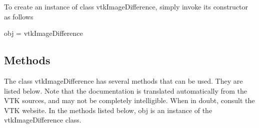 To create an instance of class vtk\-Image\-Difference, simply invoke its constructor as follows \begin{DoxyVerb}  obj = vtkImageDifference
\end{DoxyVerb}
 \hypertarget{vtkwidgets_vtkxyplotwidget_Methods}{}\subsection{Methods}\label{vtkwidgets_vtkxyplotwidget_Methods}
The class vtk\-Image\-Difference has several methods that can be used. They are listed below. Note that the documentation is translated automatically from the V\-T\-K sources, and may not be completely intelligible. When in doubt, consult the V\-T\-K website. In the methods listed below, {\ttfamily obj} is an instance of the vtk\-Image\-Difference class. 
